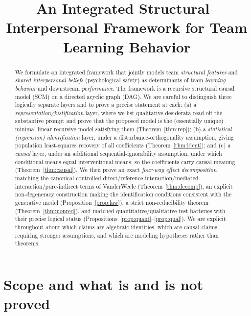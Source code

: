\documentclass{amsart}
\theoremstyle{definition}
\theoremstyle{plain}
\begin{document}
\title{An Integrated Structural--Interpersonal Framework for Team Learning Behavior}
\maketitle

\begin{abstract}
We formulate an integrated framework that jointly models team \emph{structural features}
and \emph{shared interpersonal beliefs} (psychological safety) as determinants of team
\emph{learning behavior} and downstream \emph{performance}. The framework is a recursive
structural causal model (SCM) on a directed acyclic graph (DAG). We are careful to
distinguish three logically separate layers and to prove a precise statement at each:
(a) a \emph{representation/justification} layer, where we list qualitative desiderata read
off the substantive prompt and prove that the proposed model is the (essentially unique)
minimal linear recursive model satisfying them (Theorem~\ref{thm:rep}); (b) a
\emph{statistical (regression) identification} layer, under a disturbance-orthogonality
assumption, giving population least-squares recovery of all coefficients
(Theorem~\ref{thm:ident}); and (c) a \emph{causal} layer, under an additional
sequential-ignorability assumption, under which conditional means equal interventional
means, so the coefficients carry causal meaning (Theorem~\ref{thm:causal}). We then prove an
exact \emph{four-way effect decomposition} matching the canonical
controlled-direct/reference-interaction/mediated-interaction/pure-indirect terms of
VanderWeele (Theorem~\ref{thm:decomp}), an explicit non-degeneracy construction making the
identification conditions consistent with the generative model (Proposition~\ref{prop:law}),
a strict non-reducibility theorem (Theorem~\ref{thm:nonred}), and matched
quantitative/qualitative test batteries with their precise logical status
(Propositions~\ref{prop:quant}--\ref{prop:qual}). We are explicit throughout about which
claims are algebraic identities, which are causal claims requiring stronger assumptions, and
which are modeling hypotheses rather than theorems.
\end{abstract}

\section{Scope and what is and is not proved}
\end{document}
